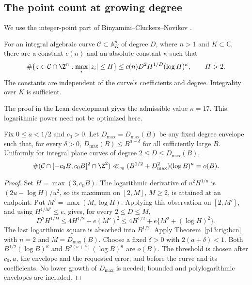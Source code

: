 \subsection{The point count at growing degree}

We use the integer-point part of Binyamini--Cluckers--Novikov
\cite[Theorem~2, equation~(27), in the specified author
version]{binyaminicluckersnovikov2024}.

\begin{theorem}
\label{p13:rig:bcn}
For an integral algebraic curve $\mathcal C\subset\mathbb A^n_K$
of degree $D$, where $n>1$ and $K\subset\mathbb C$, there are
a constant $c(n)$ and an absolute constant $\kappa$ such that
\[
 \#\{z\in\mathcal C\cap\Z^n:\max_i|z_i|\le H\}
       \le c(n)D^2H^{1/D}(\log H)^\kappa,
       \qquad H>2.
\]
The constants are independent of the curve's coefficients
and degree.  Integrality over $K$ is sufficient.
\end{theorem}

The proof in the Lean development gives the admissible value
$\kappa=17$. This logarithmic power need not be optimized here.

\begin{corollary}
\label{p13:rig:sublinear-grid}
Fix $0\le a<1/2$ and $c_0>0$. Let $D_{\max}=D_{\max}(B)$
be any fixed degree envelope such that, for every $\delta>0$,
$D_{\max}(B)\le B^{a+\delta}$ for all sufficiently large $B$.
Uniformly for integral plane curves of degree $2\le D\le D_{\max}(B)$,
\[
 \#(\mathcal C\cap[-c_0B,c_0B]^2\cap\Z^2)
 \ll_{c_0}(B^{1/2}+D_{\max}^2)(\log B)^\kappa=o(B).
\]
\end{corollary}

\begin{proof}
Set $H=\max(3,c_0B)$.  The logarithmic derivative of
$u^2H^{1/u}$ is $(2u-\log H)/u^2$, so its maximum on
$[2,M]$, $M\ge2$, is attained at an endpoint.
Put $M'=\max(M,\log H)$. Applying this observation on $[2,M']$,
and using $H^{1/M'}\le e$, gives, for every $2\le D\le M$,
\[
 D^2H^{1/D}
 \le 4H^{1/2}+e(M')^2
 \le4H^{1/2}+e\{M^2+(\log H)^2\}.
\]
The last logarithmic square is absorbed into $B^{1/2}$.
Apply Theorem~\ref{p13:rig:bcn} with $n=2$ and $M=D_{\max}(B)$.
Choose a fixed $\delta>0$ with $2(a+\delta)<1$. Both
$B^{1/2}(\log B)^\kappa$ and
$B^{2(a+\delta)}(\log B)^\kappa$ are $o(B)$.
The threshold is chosen after $c_0,a$, the envelope and the requested
error, and before the curve and its coefficients. No lower growth of
$D_{\max}$ is needed; bounded and polylogarithmic envelopes are included.
\end{proof}

